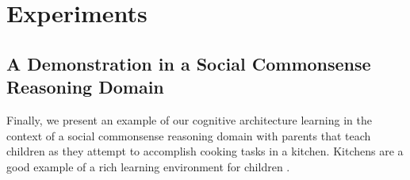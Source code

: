 \chapter{Experiments}\label{ch:experiments}

\section{A Demonstration in a Social Commonsense Reasoning Domain}

Finally, we present an example of our cognitive architecture learning
in the context of a social commonsense reasoning domain with parents
that teach children as they attempt to accomplish cooking tasks in a
kitchen.  Kitchens are a good example of a rich learning environment
for children \cite{dewey:1907}.


